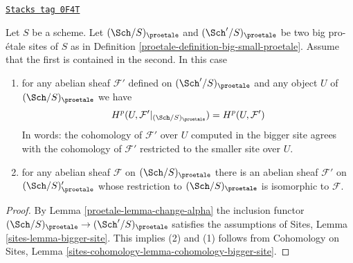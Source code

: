 \begin{lemma}
\label{proetale-lemma-cohomology-enlarge-partial-universe}
\href{https://stacks.math.columbia.edu/tag/0F4T}{\texttt{Stacks tag 0F4T}}

Let $S$ be a scheme. Let $(\Sch/S)_\proetale$ and $(\Sch'/S)_\proetale$ be two
big pro-\'etale sites of $S$ as in
Definition \ref{proetale-definition-big-small-proetale}.
Assume that the first is contained in
the second. In this case
\begin{enumerate}
\item for any abelian sheaf $\mathcal{F}'$ defined on $(\Sch'/S)_\proetale$
and any object $U$ of $(\Sch/S)_\proetale$ we have
$$
H^p(U, \mathcal{F}'|_{(\Sch/S)_\proetale}) =
H^p(U, \mathcal{F}')
$$
In words: the cohomology of $\mathcal{F}'$ over $U$ computed in the bigger site
agrees with the cohomology of $\mathcal{F}'$ restricted to the smaller site
over $U$.
\item for any abelian sheaf $\mathcal{F}$ on $(\Sch/S)_\proetale$ there is an
abelian sheaf $\mathcal{F}'$ on $(\Sch/S)_\proetale'$ whose restriction to
$(\Sch/S)_\proetale$ is isomorphic to $\mathcal{F}$.
\end{enumerate}
\end{lemma}

\begin{proof}

By Lemma \ref{proetale-lemma-change-alpha} the inclusion functor
$(\Sch/S)_\proetale \to (\Sch'/S)_\proetale$ satisfies the assumptions of
Sites, Lemma \ref{sites-lemma-bigger-site}. This implies (2) and (1)
follows from
Cohomology on Sites, Lemma \ref{sites-cohomology-lemma-cohomology-bigger-site}.
\end{proof}



